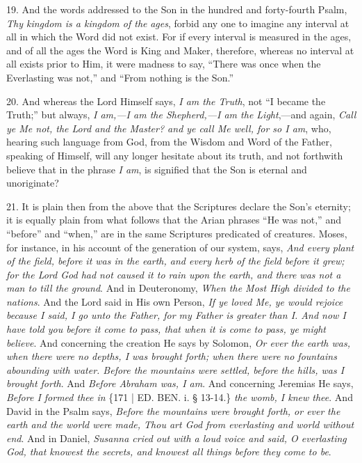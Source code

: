 19. And the words addressed to
the Son in the hundred and forty-fourth Psalm, \emph{Thy kingdom is a
kingdom of the} \emph{ages}, forbid any one to imagine any
interval at all in which the Word did not exist. For if every interval
is measured in the ages, and of all the ages the Word is King and
Maker, therefore, whereas no interval at all exists prior to Him, it
were madness to say, ``There was once when the Everlasting was not,''
and ``From nothing is the Son.''

20. And whereas the Lord
Himself says, \emph{I am the Truth}, not ``I became the Truth;'' but
always, \emph{I am,—I am the Shepherd,—I am the Light},—and
again, \emph{Call ye Me not, the Lord and the Master? and ye call Me
well, for so I am}, who, hearing such language from God, from the
Wisdom and Word of the Father, speaking of Himself, will any longer
hesitate about its truth, and not forthwith believe that in the phrase
\emph{I am}, is signified that the Son is eternal and unoriginate?

21. It is plain then from the
above that the Scriptures declare the Son's eternity; it is equally
plain from what follows that the Arian phrases ``He was not,'' and ``before''
and ``when,'' are in the same Scriptures predicated of creatures. Moses,
for instance, in his account of the generation of our system, says, \emph{And
every plant of the field, before it was in the earth, and every herb
of the field before it grew; for the Lord God had not caused it to
rain upon the earth, and there was not a man to till the ground}.
And in Deuteronomy, \emph{When the Most High divided to the nations}.
And the Lord said in His own Person, \emph{If ye loved Me, ye would
rejoice because I said, I go unto the Father, for my Father is greater
than I. And now I have told you before it come to pass, that when it
is come to pass, ye might believe}. And concerning the creation He
says by Solomon, \emph{Or ever the earth was, when there were no depths,
I was brought forth; when there were no fountains abounding with
water. Before the mountains were settled, before the hills, was I
brought forth}. And \emph{Before Abraham was, I am}. And concerning
Jeremias He says, \emph{Before I formed thee in} \{171 | ED.
BEN. i. § 13-14.\} \emph{the womb, I knew thee}.
And David in the Psalm says, \emph{Before the mountains were brought
forth, or ever} \emph{the earth and the world were made, Thou art God
from everlasting and world without end}. And in Daniel, \emph{Susanna
cried out with a loud voice and said, O everlasting God, that knowest
the secrets, and knowest all things before they come to be}.

